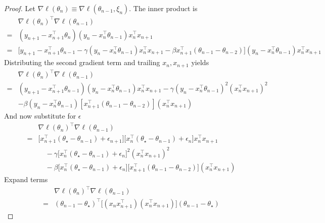 \documentclass[conference]{IEEEtran}
\begin{document}
\begin{proof}

Let $\nabla \ell(\theta_n) \equiv \nabla \ell( \theta_{n-1}, \xi_n)$.
The inner product is
\begin{align*}
&\nabla \ell ( \theta_n )^\top \nabla \ell ( \theta_{n-1} )\\
=& 
\left( y_{n+1} - x_{n+1}^\top \theta_n \right) 
\left( y_{n} - x_{n}^\top \theta_{n-1} \right) 
x_{n}^\top x_{n+1} \\
=&
\biggl[ 
y_{n+1} - x_{n+1}^\top \theta_{n-1} 
- \gamma ( y_{n} - x_{n}^\top \theta_{n-1} ) x_n^\top x_{n+1} 
- \beta x_{n+1}^\top ( \theta_{n-1} - \theta_{n-2} ) 
\biggr]
\left( y_{n} - x_{n}^\top \theta_{n-1} \right) 
x_{n}^\top x_{n+1}
\end{align*}
Distributing the second gradient term and trailing $x_n, x_{n+1}$ yields 
\begin{align*}
&\nabla \ell ( \theta_n )^\top \nabla \ell ( \theta_{n-1} )\\
=& 
\left( y_{n+1} - x_{n+1}^\top \theta_{n-1} \right) \left( y_{n} - x_{n}^\top \theta_{n-1} \right) x_{n}^\top x_{n+1} 
 - \gamma \left( y_{n} - x_{n}^\top \theta_{n-1} \right)^2 \left( x_{n}^\top x_{n+1} \right)^2 \\
&- \beta \left( y_{n} - x_{n}^\top \theta_{n-1} \right) [ x_{n+1}^\top ( \theta_{n-1} - \theta_{n-2} ) ] \left( x_{n}^\top x_{n+1} \right)
\end{align*}
And now substitute for $\epsilon$
\begin{align*}
&\nabla \ell ( \theta_n )^\top \nabla \ell ( \theta_{n-1} )\\
=& 
\biggl[ x_{n+1}^\top ( \theta_\star - \theta_{n-1} ) + \epsilon_{n+1} \biggr] 
\biggl[ x_{n}^\top ( \theta_\star - \theta_{n-1} ) + \epsilon_{n} \biggr] x_{n}^\top x_{n+1} \\
& \quad - \gamma \biggl[ x_{n}^\top ( \theta_\star - \theta_{n-1} ) + \epsilon_{n} \biggr]^2
\left( x_{n}^\top x_{n+1} \right)^2 \\
& \quad - \beta \biggl[ x_{n}^\top ( \theta_\star - \theta_{n-1} ) + \epsilon_{n} \biggr]
\biggl[ x_{n+1}^\top ( \theta_{n-1} - \theta_{n-2} ) \biggr] 
 \left( x_{n}^\top x_{n+1} \right)
 \end{align*}
 Expand terms
 \begin{align*}
 &\nabla \ell ( \theta_n )^\top \nabla \ell ( \theta_{n-1} )\\
 =& 
 ( \theta_{n-1} - \theta_\star )^\top \biggl[ ( x_n x_{n+1}^\top ) ( x_n^\top x_{n+1} ) \biggr] ( \theta_{n-1} - \theta_\star )

\end{align*}
\end{proof}
\end{document}
